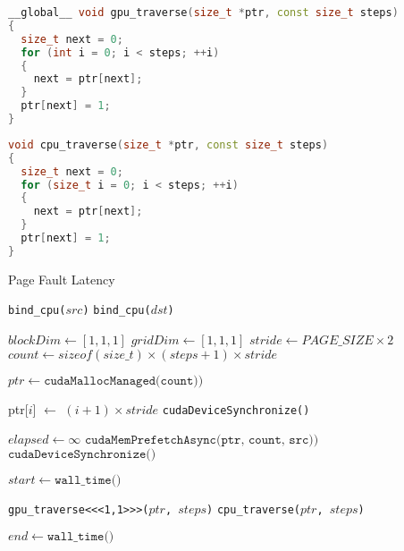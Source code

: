\begin{lstlisting}[language=c++, caption=GPU Linked List Traversal Kernel for Algorithm~\ref{alg:um-latency}, label=lst:gpu-traversal]
__global__ void gpu_traverse(size_t *ptr, const size_t steps)
{
  size_t next = 0;
  for (int i = 0; i < steps; ++i)
  {
    next = ptr[next];
  }
  ptr[next] = 1;
}
\end{lstlisting}

\begin{lstlisting}[language=c++, caption=CPU Linked List Traversal Function for Algorithm~\ref{alg:um-latency}, label=lst:cpu-traversal]
void cpu_traverse(size_t *ptr, const size_t steps)
{
  size_t next = 0;
  for (size_t i = 0; i < steps; ++i)
  {
    next = ptr[next];
  }
  ptr[next] = 1;
}
\end{lstlisting}

\begin{algorithm}
	\caption{Page Fault Latency}
	\label{alg:um-latency}
	\begin{algorithmic}[1]
		\Statex
				
            \State \texttt{bind\_cpu($src$)}
        \EndIf
            \State \texttt{bind\_cpu($dst$)}
        \EndIf

        \State $blockDim \gets [1,1,1]$ 
        \State $gridDim \gets [1,1,1]$
        \State $stride \gets PAGE\_SIZE \times 2$
        \State $count \gets sizeof(size\_t) \times (steps + 1) \times stride$

        \State $ptr \gets \texttt{cudaMallocManaged(count))}$

            \State ptr[$i$] $\gets$ $(i+1)\times stride$
        \EndFor
        \State \texttt{cudaDeviceSynchronize()}

        \State $elapsed \gets \infty$
            \State $\texttt{cudaMemPrefetchAsync(ptr, count, src))}$
            \State $\texttt{cudaDeviceSynchronize()}$

            \State $start \gets \texttt{wall\_time()}$

                \State \texttt{gpu\_traverse<<<1,1>>>($ptr$, $steps$)}
            \Else
                \State \texttt{cpu\_traverse($ptr$, $steps$)}
            \EndIf

            \State $end \gets \texttt{wall\_time()}$
        \EndFor

		\EndFunction
				
	\end{algorithmic}
\end{algorithm}

